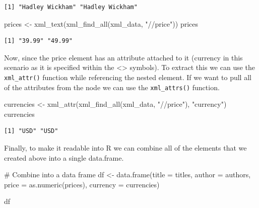 \documentclass[
  letterpaper,
  DIV=11,
  numbers=noendperiod]{scrreprt}
\newenvironment{Shaded}{\begin{snugshade}}{\end{snugshade}}
\newcommand{\AttributeTok}[1]{\textcolor[rgb]{0.40,0.45,0.13}{#1}}
\newcommand{\CommentTok}[1]{\textcolor[rgb]{0.37,0.37,0.37}{#1}}
\newcommand{\FunctionTok}[1]{\textcolor[rgb]{0.28,0.35,0.67}{#1}}
\newcommand{\NormalTok}[1]{\textcolor[rgb]{0.00,0.23,0.31}{#1}}
\newcommand{\OtherTok}[1]{\textcolor[rgb]{0.00,0.23,0.31}{#1}}
\newcommand{\StringTok}[1]{\textcolor[rgb]{0.13,0.47,0.30}{#1}}
\begin{document}
\begin{verbatim}
[1] "Hadley Wickham" "Hadley Wickham"
\end{verbatim}

\begin{Shaded}
\begin{Highlighting}[]
\NormalTok{prices }\OtherTok{\textless{}{-}} \FunctionTok{xml\_text}\NormalTok{(}\FunctionTok{xml\_find\_all}\NormalTok{(xml\_data, }\StringTok{"//price"}\NormalTok{))}
\NormalTok{prices}
\end{Highlighting}
\end{Shaded}

\begin{verbatim}
[1] "39.99" "49.99"
\end{verbatim}

Now, since the price element has an attribute attached to it (currency
in this scenario as it is specified within the \textless\textgreater{}
symbols). To extract this we can use the \texttt{xml\_attr()} function
while referencing the nested element. If we want to pull all of the
attributes from the node we can use the \texttt{xml\_attrs()} function.

\begin{Shaded}
\begin{Highlighting}[]
\NormalTok{currencies }\OtherTok{\textless{}{-}} \FunctionTok{xml\_attr}\NormalTok{(}\FunctionTok{xml\_find\_all}\NormalTok{(xml\_data, }\StringTok{"//price"}\NormalTok{), }\StringTok{"currency"}\NormalTok{) }
\NormalTok{currencies}
\end{Highlighting}
\end{Shaded}

\begin{verbatim}
[1] "USD" "USD"
\end{verbatim}

Finally, to make it readable into R we can combine all of the elements
that we created above into a single data.frame.

\begin{Shaded}
\begin{Highlighting}[]
\CommentTok{\# Combine into a data frame }
\NormalTok{df }\OtherTok{\textless{}{-}} \FunctionTok{data.frame}\NormalTok{(}\AttributeTok{title =}\NormalTok{ titles, }\AttributeTok{author =}\NormalTok{ authors, }
                 \AttributeTok{price =} \FunctionTok{as.numeric}\NormalTok{(prices), }\AttributeTok{currency =}\NormalTok{ currencies)}

\NormalTok{df}
\end{Highlighting}
\end{Shaded}
\end{document}
